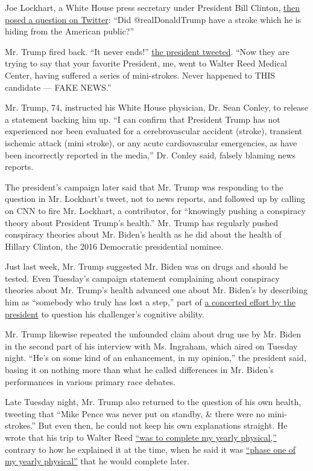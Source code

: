 Joe Lockhart, a White House press secretary under President Bill
Clinton,
\href{https://twitter.com/joelockhart/status/1300574701253734402?s=20}{then
posed a question on Twitter}: ``Did @realDonaldTrump have a stroke which
he is hiding from the American public?''

Mr. Trump fired back. ``It never ends!''
\href{https://twitter.com/realDonaldTrump/status/1300811758051954695}{the
president tweeted}. ``Now they are trying to say that your favorite
President, me, went to Walter Reed Medical Center, having suffered a
series of mini-strokes. Never happened to THIS candidate --- FAKE
NEWS.''

Mr. Trump, 74, instructed his White House physician, Dr. Sean Conley, to
release a statement backing him up. ``I can confirm that President Trump
has not experienced nor been evaluated for a cerebrovascular accident
(stroke), transient ischemic attack (mini stroke), or any acute
cardiovascular emergencies, as have been incorrectly reported in the
media,'' Dr. Conley said, falsely blaming news reports.

The president's campaign later said that Mr. Trump was responding to the
question in Mr. Lockhart's tweet, not to news reports, and followed up
by calling on CNN to fire Mr. Lockhart, a contributor, for ``knowingly
pushing a conspiracy theory about President Trump's health.'' Mr. Trump
has regularly pushed conspiracy theories about Mr. Biden's health as he
did about the health of Hillary Clinton, the 2016 Democratic
presidential nominee.

Just last week, Mr. Trump suggested Mr. Biden was on drugs and should be
tested. Even Tuesday's campaign statement complaining about conspiracy
theories about Mr. Trump's health advanced one about Mr. Biden's by
describing him as ``somebody who truly has lost a step,'' part of
\href{https://www.nytimes3xbfgragh.onion/2020/08/17/us/politics/trump-campaign-biden-harris.html}{a
concerted effort by the president} to question his challenger's
cognitive ability.

Mr. Trump likewise repeated the unfounded claim about drug use by Mr.
Biden in the second part of his interview with Ms. Ingraham, which aired
on Tuesday night. ``He's on some kind of an enhancement, in my
opinion,'' the president said, basing it on nothing more than what he
called differences in Mr. Biden's performances in various primary race
debates.

Late Tuesday night, Mr. Trump also returned to the question of his own
health, tweeting that ``Mike Pence was never put on standby, \& there
were no mini-strokes.'' But even then, he could not keep his own
explanations straight. He wrote that his trip to Walter Reed
\href{https://twitter.com/realDonaldTrump/status/1300983667561562118}{``was
to complete my yearly physical,''} contrary to how he explained it at
the time, when he said it was
\href{https://twitter.com/realDonaldTrump/status/1195931893998456832}{``phase
one of my yearly physical''} that he would complete later.

